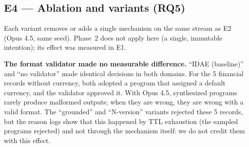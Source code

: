 \documentclass[sigconf,nonacm]{acmart}
\begin{document}
\subsection{E4 --- Ablation and variants (RQ5)}

Each variant removes or adds a single mechanism on the same stream as E2 (Opus 4.5, same seed). Phase~2 does not apply here (a single, immutable intention); its effect was measured in E1.

\begin{table}[h]
\caption{E4 --- Ablation ($n=550$ per domain; ``no amortization'' on the 150-record subsample, whose maximum ``Correct'' is 76.7\%)}
\label{tab:e4}
\end{table}

\textbf{The format validator made no measurable difference.} ``IDAE (baseline)'' and ``no validator'' made identical decisions in both domains. For the 5 financial records without currency, both adopted a program that assigned a default currency, and the validator approved it. With Opus 4.5, synthesized programs rarely produce malformed outputs; when they are wrong, they are wrong with a valid format. The ``grounded'' and ``N-version'' variants rejected these 5 records, but the reason logs show that this happened by TTL exhaustion (the sampled programs rejected) and not through the mechanism itself: we do not credit them with this effect.
\end{document}
